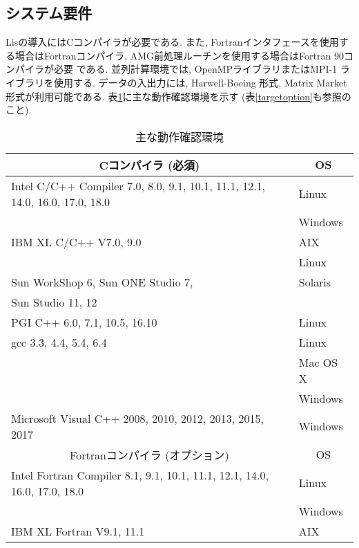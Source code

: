 \documentclass[a4paper]{jarticle}
\begin{document}
\subsection{システム要件}
Lisの導入にはCコンパイラが必要である. 
また, Fortranインタフェースを使用する場合はFortranコンパイラ, 
AMG前処理ルーチンを使用する場合はFortran 90コンパイラが必要
である. 並列計算環境では, OpenMPライブラリ\cite{OpenMP}またはMPI-1
ライブラリ\cite{MPI}を使用する\cite{kota1,kota2}. 
データの入出力には, Harwell-Boeing 
形式\cite{duff92}, Matrix Market形式\cite{matrixmarket}が利用可能である. 
表\ref{platforms}に主な動作確認環境を示す
 (表\ref{targetoption}も参照のこと). 

\begin{table}[htbp]
\caption{主な動作確認環境}
\label{platforms}
\begin{center}
{\small
 \begin{tabular}{l|l}
\hline
\multicolumn{1}{c|}{Cコンパイラ (必須) } & \multicolumn{1}{c}{OS} \\
\hline
Intel C/C++ Compiler 7.0, 8.0, 9.1, 10.1, 11.1, 12.1, 14.0, 16.0, 17.0, 18.0 & Linux \\
                                                     & Windows  \\
\hline
IBM XL C/C++ V7.0, 9.0                     & AIX   \\
                                           & Linux \\
\hline
Sun WorkShop 6, Sun ONE Studio 7,          & Solaris \\
Sun Studio 11, 12                          &         \\
\hline
PGI C++ 6.0, 7.1, 10.5, 16.10              & Linux \\
\hline
gcc 3.3, 4.4, 5.4, 6.4                     & Linux \\
                                           & Mac OS X \\
                                           & Windows \\
\hline
Microsoft Visual C++ 2008, 2010, 2012, 2013, 2015, 2017       & Windows \\
\hline
\hline
\multicolumn{1}{c|}{Fortranコンパイラ (オプション) } & \multicolumn{1}{c}{OS} \\
\hline
Intel Fortran Compiler 8.1, 9.1, 10.1, 11.1, 12.1, 14.0, 16.0, 17.0, 18.0 & Linux \\
                                                  & Windows  \\
\hline
IBM XL Fortran V9.1, 11.1                  & AIX     \\

\end{tabular}}
\end{center}
\end{table}
\end{document}

